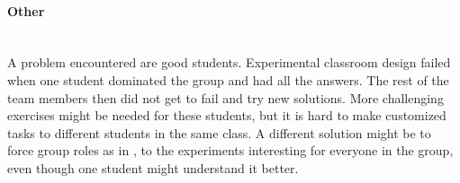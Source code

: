\paragraph{Other}~\\
A problem encountered are good students. Experimental classroom design failed when one student dominated the group and had all the answers. The rest of the team members then did not get to fail and try new solutions. More challenging exercises might be needed for these students, but it is hard to make customized tasks to different students in the same class. A different solution might be to force group roles as in \cite{mitnik2009collaborative}, to the experiments interesting for everyone in the group, even though one student might understand it better.